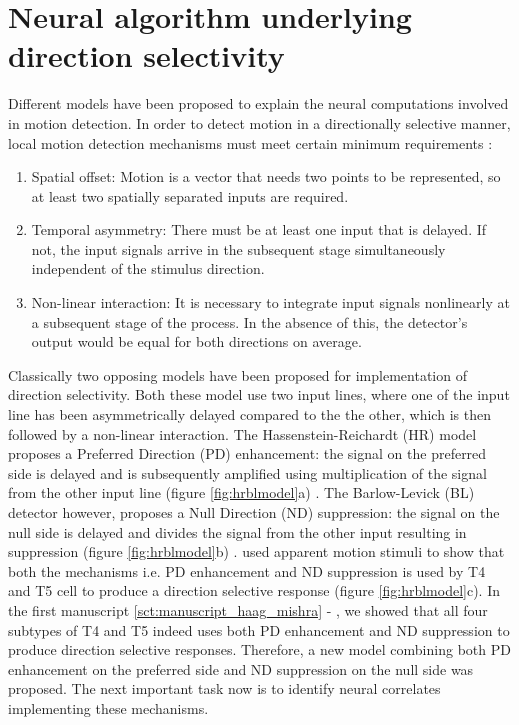 \section{Neural algorithm underlying direction selectivity}
Different models have been proposed to explain the neural computations involved in motion detection. In order to detect motion in a directionally selective manner, local motion detection mechanisms must meet certain minimum requirements \parencite{Borst1989}:
\begin{enumerate}
\item Spatial offset: Motion is a vector that needs two points to be represented, so at least two spatially separated inputs are required.
\item Temporal asymmetry: There must be at least one input that is delayed. If not, the input signals arrive in the subsequent stage simultaneously independent of the stimulus direction.
\item Non-linear interaction: It is necessary to integrate input signals nonlinearly at a subsequent stage of the process. In the absence of this, the detector's output would be equal for both directions on average.
\end{enumerate} 

Classically two opposing models have been proposed for implementation of direction selectivity. Both these model use two input lines, where one of the input line has been asymmetrically delayed compared to the the other, which is then followed by a non-linear interaction. The Hassenstein-Reichardt (HR) model proposes a Preferred Direction (PD) enhancement: the signal on the preferred side is delayed and is subsequently amplified using multiplication of the signal from the other input line (figure \ref{fig:hrblmodel}a) \parencite{Hassenstein1956}. The Barlow-Levick (BL) detector however, proposes a Null Direction (ND) suppression: the signal on the null side is delayed and divides the signal from the other input resulting in suppression (figure \ref{fig:hrblmodel}b) \parencite{Barlow1965} . \cite{Haag2016} used apparent motion stimuli to show that both the mechanisms i.e. PD enhancement and ND suppression is used by T4 and T5 cell to produce a direction selective response (figure \ref{fig:hrblmodel}c). In the first manuscript \ref{sct:manuscript_haag_mishra} - \parencite{Haag2017}, we showed that all four subtypes of T4 and T5 indeed uses both PD enhancement and ND suppression to produce direction selective responses. Therefore, a new model combining both PD enhancement on the preferred side and ND suppression on the null side was proposed. The next important task now is to identify neural correlates implementing these mechanisms. 

